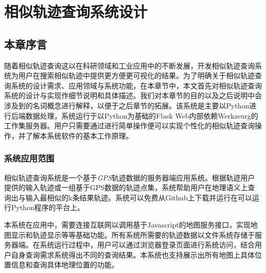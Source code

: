 
\chapter{相似轨迹查询系统设计}
\label{chap:system requirement specification}

\section{本章序言}
\label{sec:introduction}
随着相似轨迹查询这以在科研领域和工业应用中的不断发展，开发相似轨迹查询系统为用户在搜索相似轨迹中提供更方便更可视化的结果。为了明确关于相似轨迹查询系统的设计需求、应用领域与系统功能，在本章节中，本文首先对相似轨迹查询系统的设计与实现作细节说明和具体描述。我们对本章节的目的以及之后说明中会涉及到的名词概念进行解释，以便于之后章节的拓展。该系统是主要以Python进行后端数据处理，系统运行于以Python为基础的Flask Web内部依赖Werkzeurg的工作集服务器。用户只需要通过进行简单操作便可以实现个性化的相似轨迹查询操作，并了解本系统软件的基本工作原理。


\subsection{系统应用范围}
\label{subsec:scope}
相似轨迹查询系统是一个基于\emph{GPS}轨迹数据的服务器端应用系统。根据轨迹用户提供的输入轨迹或一组基于GPS数据的轨迹点集，系统帮助用户在地理语义上查询出与输入最相似的k条结果轨迹。系统可以免费从Github上下载并运行在可以运行Python程序的平台上。

本系统在应用中，需要连接互联网以调用基于Javascript的地图服务接口，实现地图显示和轨迹显示等等基础功能。所有系统所需要的轨迹数据以文件系统存储于服务器端。在系统运行过程中，用户可以通过浏览器登录页面进行系统访问，结合用户自身查询需求系统得出不同的查询结果。本系统也支持展示出所有地图上具体位置信息和查询具体地理位置的功能。


